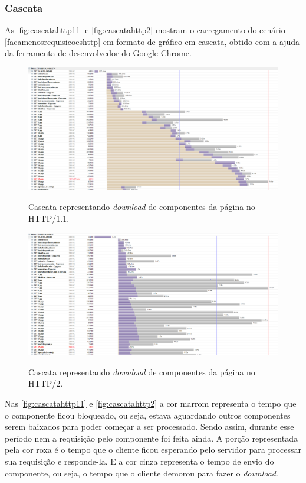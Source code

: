 \subsubsection{Cascata}
\label{cascata}

As \autoref{fig:cascatahttp11} e \autoref{fig:cascatahttp2} mostram o carregamento do cenário \autoref{facamenosrequisicoeshttp} em formato de gráfico em cascata, obtido com a ajuda da ferramenta de desenvolvedor do Google Chrome.

\begin{figure}[!htb]
    \centering
    \caption{Cascata representando \textit{download} de componentes da página no HTTP/1.1.}
    \includegraphics[width=1.0\textwidth]{./04-figuras/analise-de-resultados/cascata_http11}
    \label{fig:cascatahttp11}
\end{figure}

\begin{figure}[!htb]
    \centering
    \caption{Cascata representando \textit{download} de componentes da página no HTTP/2.}
    \includegraphics[width=1.0\textwidth]{./04-figuras/analise-de-resultados/cascata_http2}
    \label{fig:cascatahttp2}
\end{figure}

Nas \autoref{fig:cascatahttp11} e \autoref{fig:cascatahttp2} a cor marrom representa o tempo que o componente ficou bloqueado, ou seja, estava aguardando outros componentes serem baixados para poder começar a ser processado. Sendo assim, durante esse período nem a requisição pelo componente foi feita ainda. A porção representada pela cor roxa é o tempo que o cliente ficou esperando pelo servidor para processar sua requisição e responde-la. E a cor cinza representa o tempo de envio do componente, ou seja, o tempo que o cliente demorou para fazer o \textit{download}.

